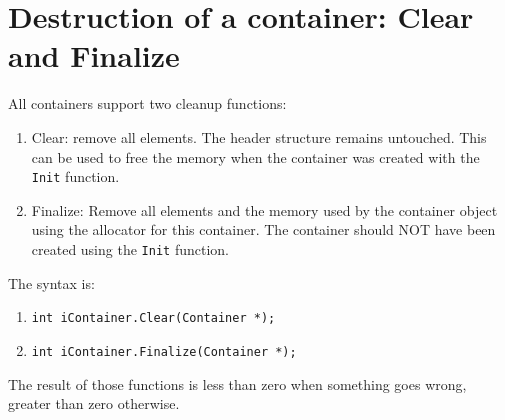 \documentclass[12pt,a4paper]{memoir} %
\begin{document}
\section{Destruction of a container: Clear and Finalize}
All containers support two cleanup functions:
\begin{enumerate}
\item
Clear: remove all elements. The header structure remains untouched. This can be used to free the memory when the container was created with the \texttt{Init} function.
\item
Finalize: Remove all elements and the memory used by the container object using the allocator for this container. The container should NOT have been created using the \texttt{Init} function.
\end{enumerate}
The syntax is:
\begin{enumerate}
\item \texttt{int iContainer.Clear(Container *);}
\item \texttt{int iContainer.Finalize(Container *);}
\end{enumerate}
The result of those functions is less than zero when something goes wrong, greater than zero otherwise.
\end{document}

